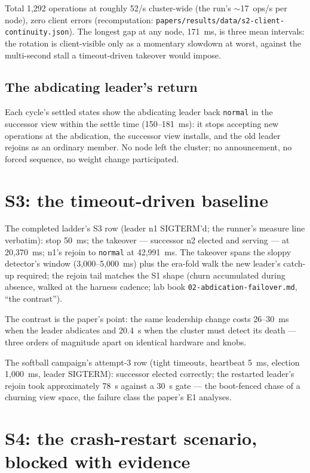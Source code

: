 \documentclass[10pt,journal,letterpaper]{IEEEtran}
\newcommand{\code}[1]{\texttt{\small #1}}
\begin{document}
Total 1{,}292 operations at roughly 52/s cluster-wide (the run's
$\sim$17~ops/s per node), zero client errors (recomputation:
\code{papers/results/data/s2-client-continuity.json}). The longest gap at any
node, 171~ms, is three mean intervals: the rotation is client-visible
only as a momentary slowdown at worst, against the multi-second stall
a timeout-driven takeover would impose.

\subsection{The abdicating leader's return}

Each cycle's settled states show the abdicating leader back
\code{normal} in the successor view within the settle time
(150--181~ms): it stops accepting new operations at the abdication,
the successor view installs, and the old leader rejoins as an ordinary
member. No node left the cluster; no announcement, no forced sequence,
no weight change participated.

\section{S3: the timeout-driven baseline}
\label{sec:s3}

The completed ladder's S3 row (leader n1 SIGTERM'd; the runner's
measure line verbatim): stop 50~ms; the takeover --- successor n2
elected and serving --- at 20{,}370~ms; n1's rejoin to \code{normal}
at 42{,}991~ms. The takeover spans the sloppy detector's window
(3{,}000--5{,}000~ms) plus the era-fold walk the new leader's catch-up
required; the rejoin tail matches the S1 shape (churn accumulated
during absence, walked at the harness cadence; lab book
\code{02-abdication-failover.md}, ``the contrast'').

The contrast is the paper's point: the same leadership change costs
26--30~ms when the leader abdicates and 20.4~s when the cluster must
detect its death --- three orders of magnitude apart on identical
hardware and knobs.

The softball campaign's attempt-3 row (tight timeouts, heartbeat
5~ms, election 1{,}000~ms, leader SIGTERM): successor elected
correctly; the restarted leader's rejoin took approximately 78~s
against a 30~s gate --- the boot-fenced chase of a churning view
space, the failure class the paper's E1 analyses.

\section{S4: the crash-restart scenario, blocked with evidence}
\label{sec:s4}
\end{document}
